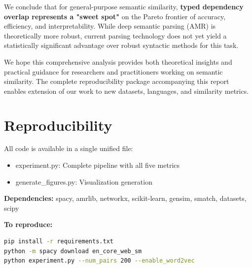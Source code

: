 \documentclass[11pt,a4paper]{article}
\begin{document}
We conclude that for general-purpose semantic similarity, \textbf{typed dependency overlap represents a "sweet spot"} on the Pareto frontier of accuracy, efficiency, and interpretability. While deep semantic parsing (AMR) is theoretically more robust, current parsing technology does not yet yield a statistically significant advantage over robust syntactic methods for this task.

We hope this comprehensive analysis provides both theoretical insights and practical guidance for researchers and practitioners working on semantic similarity. The complete reproducibility package accompanying this report enables extension of our work to new datasets, languages, and similarity metrics.

\section{Reproducibility}

All code is available in a single unified file:
\begin{itemize}
    \item experiment.py: Complete pipeline with all five metrics
    \item generate\_figures.py: Visualization generation
\end{itemize}

\textbf{Dependencies:} spacy, amrlib, networkx, scikit-learn, gensim, smatch, datasets, scipy

\textbf{To reproduce:}
\begin{lstlisting}[language=bash]
pip install -r requirements.txt
python -m spacy download en_core_web_sm
python experiment.py --num_pairs 200 --enable_word2vec
\end{lstlisting}



\end{document}

